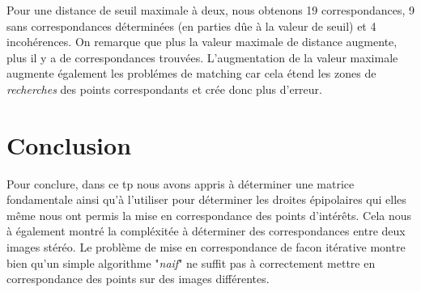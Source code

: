 \documentclass[a4paper,12pt]{report}
\begin{document}
Pour une distance de seuil maximale à deux, nous obtenons 19 correspondances, 9 sans correspondances déterminées (en parties dûe à la valeur de seuil) et 4 incohérences. On remarque que plus la valeur maximale de distance augmente, plus il y a de correspondances trouvées. L'augmentation de la valeur maximale augmente également les problémes de matching car cela étend les zones de \textit{recherches} des points correspondants et crée donc plus d'erreur.


\section*{Conclusion}

Pour conclure, dans ce tp nous avons appris à déterminer une matrice fondamentale ainsi qu'à l'utiliser pour déterminer les droites épipolaires qui elles même nous ont permis la mise en correspondance des points d'intérêts. Cela nous à également montré la compléxitée à déterminer des correspondances entre deux images stéréo. Le problème de mise en correspondance de facon itérative montre bien qu'un simple algorithme "\textit{naif}" ne suffit pas à correctement mettre en correspondance des points sur des images différentes.
\end{document}
